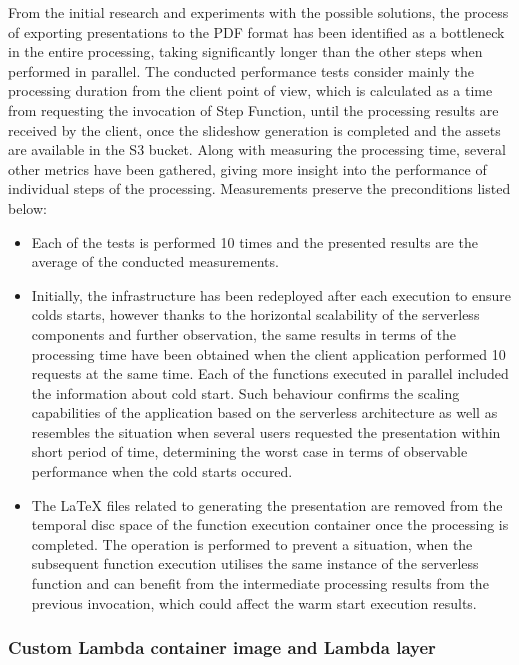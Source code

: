 From the initial research and experiments with the possible solutions, the process of exporting presentations to the PDF format has been identified as a bottleneck in the entire processing, taking significantly longer than the other steps when performed in parallel.
The conducted performance tests consider mainly the processing duration from the client point of view, which is calculated as a time from requesting the invocation of Step Function, until the processing results are received by the client, once the slideshow generation is completed and the assets are available in the S3 bucket.
Along with measuring the processing time, several other metrics have been gathered, giving more insight into the performance of individual steps of the processing.
Measurements preserve the preconditions listed below:

\begin{itemize}
   \item Each of the tests is performed 10 times and the presented results are the average of the conducted measurements.
   \item Initially, the infrastructure has been redeployed after each execution to ensure colds starts, however thanks to the horizontal scalability of the serverless components and further observation, the same results in terms of the processing time have been obtained when the client application performed 10 requests at the same time. 
   Each of the functions executed in parallel included the information about cold start.
   Such behaviour confirms the scaling capabilities of the application based on the serverless architecture as well as resembles the situation when several users requested the presentation within short period of time, determining the worst case in terms of observable performance when the cold starts occured.
   \item The LaTeX files related to generating the presentation are removed from the temporal disc space of the function execution container once the processing is completed.
   The operation is performed to prevent a situation, when the subsequent function execution utilises the same instance of the serverless function and can benefit from the intermediate processing results from the previous invocation, which could affect the warm start execution results.
\end{itemize}

\subsubsection{Custom Lambda container image and Lambda layer}


